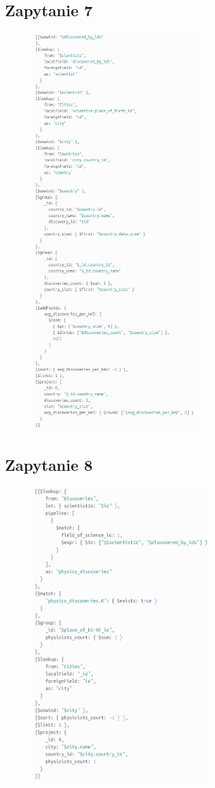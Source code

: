\documentclass[11pt]{article}
\begin{document}
	\subsection{Zapytanie 7}
		\begin{figure}[!ht]
			\begin{center}
				\includegraphics[width=230px]{m7.png}
			\end{center}
		\end{figure}

\newpage
	\subsection{Zapytanie 8}
		\begin{figure}[!ht]
			\begin{center}
				\includegraphics[width=250px]{m8.png}
			\end{center}
		\end{figure}
\end{document}
